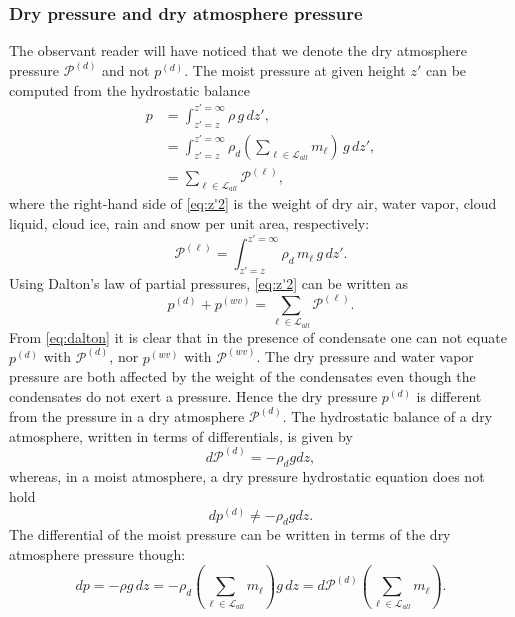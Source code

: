 \documentclass{agujournal}
\begin{document}
{\subsubsection{Dry pressure and dry atmosphere pressure}
The observant reader will have noticed that we denote the dry atmosphere pressure $\mathcal{P}^{(d)}$ and not $p^{(d)}$. The moist pressure at given height $z'$ can be computed from the hydrostatic balance
\begin{align}
p&=\int^{z'=\infty}_{z'=z}\rho\, g\, dz',\\
 &=\int^{z'=\infty}_{z'=z}\rho_d \left( \sum_{\ell \in \mathcal{L}_{all}} m_\ell \right)\, g\, dz',\\
 &=\sum_{\ell \in \mathcal{L}_{all}} \mathcal{P}^{(\ell)},\label{eq:z'2}
\end{align}
where the right-hand side of \eqref{eq:z'2} is the weight of dry air, water vapor, cloud liquid, cloud ice, rain and snow per unit area, respectively:
\begin{equation}
{\mathcal{P}}^{(\ell)}=\int^{z'=\infty}_{z'=z}\rho_d \, m_\ell \, g\, dz'\label{eq:z'}.
\end{equation}
Using Dalton's law of partial pressures, \eqref{eq:z'2} can be written as
\begin{equation}
p^{(d)}+p^{(wv)}=\sum_{\ell \in \mathcal{L}_{all}} {\mathcal{P}}^{(\ell)}.\label{eq:dalton}
\end{equation}
From \eqref{eq:dalton} it is clear that in the presence of condensate one can not equate $p^{(d)}$ with ${\mathcal{P}}^{(d)}$, nor $p^{(wv)}$ with ${\mathcal{P}}^{(wv)}$. The dry pressure and water vapor pressure are both affected by the weight of the condensates even though the condensates do not exert a pressure. Hence the dry pressure $p^{(d)}$ is different from the pressure in a dry atmosphere $\mathcal{P}^{(d)}$. The hydrostatic balance of a dry atmosphere, written in terms of differentials, is given by
\begin{equation}
d\mathcal{P}^{(d)}=-\rho_d g dz,\label{eq:dry_atm_hydro}
\end{equation}
whereas, in a moist atmosphere, a dry pressure hydrostatic equation does not hold
\begin{equation}
dp^{(d)}\ne -\rho_d g dz.
\end{equation}
The differential of the moist pressure can be written in terms of the dry atmosphere pressure though:
\begin{equation}
dp=-\rho g \, dz = -\rho_d \left( \sum_{\ell \in \mathcal{L}_{all}} m_\ell\right)g\, dz = d\mathcal{P}^{(d)}\left( \sum_{\ell \in \mathcal{L}_{all}} m_\ell\right).
\end{equation}

}
\end{document}
